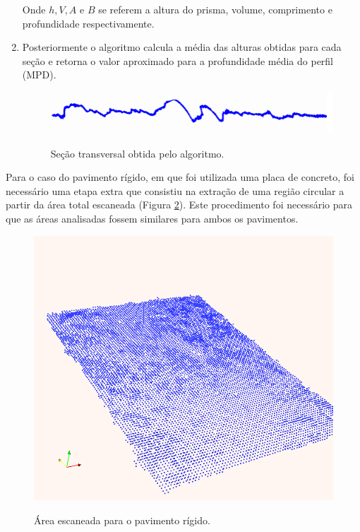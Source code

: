 \begin{enumerate}
\noindent Onde $h, V, A$ e $B$ se referem a altura do prisma, volume, comprimento e profundidade respectivamente.

\item Posteriormente o algoritmo calcula a média das alturas obtidas para cada seção e retorna o valor aproximado para a profundidade média do perfil (MPD).

\begin{figure}[!ht]
\centering
{\includegraphics[scale=0.7]{figures/perfil.jpg}}\\
\caption{Seção transversal obtida pelo algoritmo.} 
\label{Fig:perfil}
\end{figure}
\end{enumerate}

Para o caso do pavimento rígido, em que foi utilizada uma placa de concreto, foi necessário uma etapa extra que consistiu na extração de uma região circular a partir da área total escaneada (Figura \ref{Fig:placaecp}). Este procedimento foi necessário para que as áreas analisadas fossem similares para ambos os pavimentos. 

\begin{figure}[!ht]
\centering
{\includegraphics[scale=0.5]{figures/placa.jpg}}\\
\caption{Área escaneada para o pavimento rígido.}
\label{Fig:placaecp}
\end{figure}

